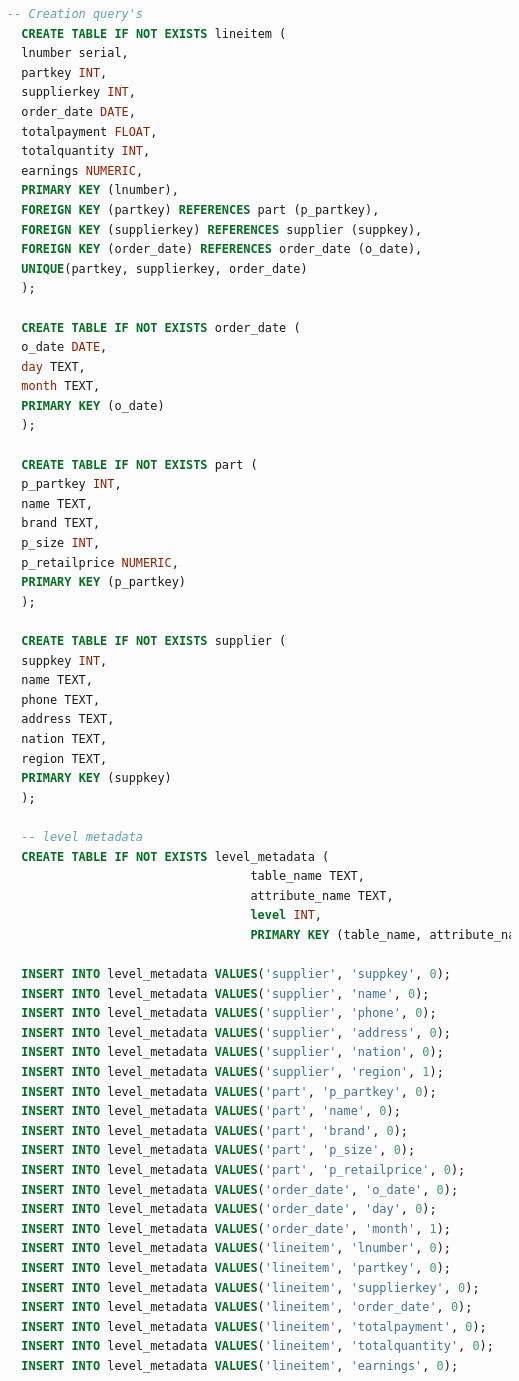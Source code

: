 \begin{lstlisting}[label={genquery2}, caption={Consultas de creaci\'on generadas para el experimento 2}, language={sql}]
  -- Creation query's
  CREATE TABLE IF NOT EXISTS lineitem (
  lnumber serial, 
  partkey INT, 
  supplierkey INT, 
  order_date DATE, 
  totalpayment FLOAT, 
  totalquantity INT, 
  earnings NUMERIC, 
  PRIMARY KEY (lnumber), 
  FOREIGN KEY (partkey) REFERENCES part (p_partkey), 
  FOREIGN KEY (supplierkey) REFERENCES supplier (suppkey), 
  FOREIGN KEY (order_date) REFERENCES order_date (o_date), 
  UNIQUE(partkey, supplierkey, order_date)
  );

  CREATE TABLE IF NOT EXISTS order_date (
  o_date DATE, 
  day TEXT, 
  month TEXT, 
  PRIMARY KEY (o_date)
  );

  CREATE TABLE IF NOT EXISTS part (
  p_partkey INT, 
  name TEXT, 
  brand TEXT, 
  p_size INT, 
  p_retailprice NUMERIC, 
  PRIMARY KEY (p_partkey)
  );

  CREATE TABLE IF NOT EXISTS supplier (
  suppkey INT, 
  name TEXT, 
  phone TEXT, 
  address TEXT, 
  nation TEXT, 
  region TEXT, 
  PRIMARY KEY (suppkey)
  );

  -- level metadata 
  CREATE TABLE IF NOT EXISTS level_metadata (
                                  table_name TEXT,
                                  attribute_name TEXT,
                                  level INT,
                                  PRIMARY KEY (table_name, attribute_name, level));

  INSERT INTO level_metadata VALUES('supplier', 'suppkey', 0);
  INSERT INTO level_metadata VALUES('supplier', 'name', 0);
  INSERT INTO level_metadata VALUES('supplier', 'phone', 0);
  INSERT INTO level_metadata VALUES('supplier', 'address', 0);
  INSERT INTO level_metadata VALUES('supplier', 'nation', 0);
  INSERT INTO level_metadata VALUES('supplier', 'region', 1);
  INSERT INTO level_metadata VALUES('part', 'p_partkey', 0);
  INSERT INTO level_metadata VALUES('part', 'name', 0);
  INSERT INTO level_metadata VALUES('part', 'brand', 0);
  INSERT INTO level_metadata VALUES('part', 'p_size', 0);
  INSERT INTO level_metadata VALUES('part', 'p_retailprice', 0);
  INSERT INTO level_metadata VALUES('order_date', 'o_date', 0);
  INSERT INTO level_metadata VALUES('order_date', 'day', 0);
  INSERT INTO level_metadata VALUES('order_date', 'month', 1);
  INSERT INTO level_metadata VALUES('lineitem', 'lnumber', 0);
  INSERT INTO level_metadata VALUES('lineitem', 'partkey', 0);
  INSERT INTO level_metadata VALUES('lineitem', 'supplierkey', 0);
  INSERT INTO level_metadata VALUES('lineitem', 'order_date', 0);
  INSERT INTO level_metadata VALUES('lineitem', 'totalpayment', 0);
  INSERT INTO level_metadata VALUES('lineitem', 'totalquantity', 0);
  INSERT INTO level_metadata VALUES('lineitem', 'earnings', 0);
\end{lstlisting}

